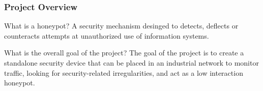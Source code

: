 \begin{frame}
\frametitle{Project Overview}

\begin{block}{What is a honeypot?}
A security mechanism desinged to detects, deflects or counteracts attempts at unauthorized use of information systems.
\end{block}
 


\begin{block}{What is the overall goal of the project?}
The goal of the project is to create a standalone security device that can be placed in an industrial network to monitor traffic, looking for security-related irregularities, and act as a low interaction honeypot.
\end{block}
\end{frame}
